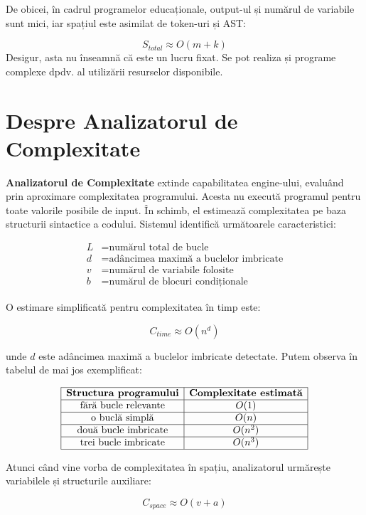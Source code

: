 \documentclass[12pt]{article}
\begin{document}
De obicei, în cadrul programelor educaționale, output-ul și numărul de variabile sunt mici, iar spațiul este asimilat de token-uri și AST:

\[
S_{total} \approx O(m + k)
\]
Desigur, asta nu înseamnă că este un lucru fixat. Se pot realiza și programe complexe dpdv. al utilizării resurselor disponibile.

\section{Despre Analizatorul de Complexitate}

\textbf{Analizatorul de Complexitate} extinde capabilitatea engine-ului, evaluând prin aproximare complexitatea programului. Acesta nu execută programul pentru toate valorile posibile de input. În schimb, el estimează complexitatea pe baza structurii sintactice a codului. Sistemul identifică următoarele caracteristici:

\[
\begin{aligned}
L &= \text{numărul total de bucle} \\
d &= \text{adâncimea maximă a buclelor imbricate} \\
v &= \text{numărul de variabile folosite} \\
b &= \text{numărul de blocuri condiționale}
\end{aligned}
\]

O estimare simplificată pentru complexitatea în timp este:

\[
C_{time} \approx O(n^d)
\]

unde \(d\) este adâncimea maximă a buclelor imbricate detectate. Putem observa în tabelul de mai jos exemplificat:

\[
\begin{array}{|c|c|}
\hline
\textbf{Structura programului} & \textbf{Complexitate estimată} \\
\hline
\text{fără bucle relevante} & O(1) \\
\hline
\text{o buclă simplă} & O(n) \\
\hline
\text{două bucle imbricate} & O(n^2) \\
\hline
\text{trei bucle imbricate} & O(n^3) \\
\hline
\end{array}
\]

Atunci când vine vorba de complexitatea în spațiu, analizatorul urmărește variabilele și structurile auxiliare:

\[
C_{space} \approx O(v + a)
\]
\end{document}
